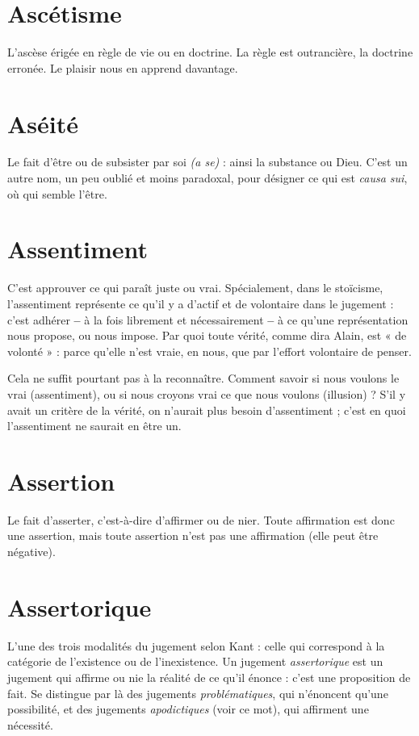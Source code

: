 \section{Ascétisme}
L’ascèse érigée en règle de vie ou en doctrine. La règle est
outrancière, la doctrine erronée. Le plaisir nous en apprend
davantage.

\section{Aséité}
Le fait d’être ou de subsister par soi {\it (a se)} : ainsi la substance ou
Dieu. C’est un autre nom, un peu oublié et moins paradoxal, pour
désigner ce qui est {\it causa sui}, où qui semble l’être.

\section{Assentiment}
C’est approuver ce qui paraît juste ou vrai. Spécialement,
dans le stoïcisme, l’assentiment représente ce qu’il y a
d’actif et de volontaire dans le jugement : c’est adhérer {\bf --} à la fois librement et
nécessairement {\bf --} à ce qu’une représentation nous propose, ou nous impose.
Par quoi toute vérité, comme dira Alain, est « de volonté » : parce qu’elle n’est
vraie, en nous, que par l'effort volontaire de penser.

Cela ne suffit pourtant pas à la reconnaître. Comment savoir si nous voulons
le vrai (assentiment), ou si nous croyons vrai ce que nous voulons
(illusion) ? S'il y avait un critère de la vérité, on n’aurait plus besoin
d’assentiment ; c’est en quoi l’assentiment ne saurait en être un.

\section{Assertion}
Le fait d’asserter, c’est-à-dire d’affirmer ou de nier. Toute affirmation
est donc une assertion, mais toute assertion n’est pas
une affirmation (elle peut être négative).

\section{Assertorique}
L’une des trois modalités du jugement selon Kant : celle
qui correspond à la catégorie de l’existence ou de l’inexistence.
Un jugement {\it assertorique} est un jugement qui affirme ou nie la réalité de
ce qu’il énonce : c’est une proposition de fait. Se distingue par là des jugements
{\it problématiques}, qui n’énoncent qu’une possibilité, et des jugements {\it apodictiques}
(voir ce mot), qui affirment une nécessité.

